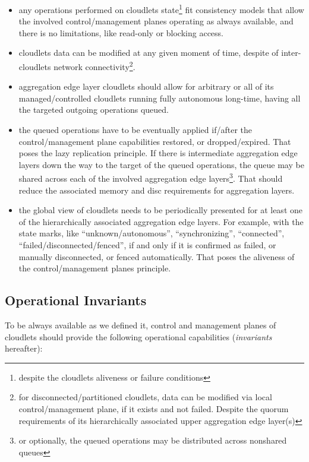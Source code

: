 \documentclass[conference]{IEEEtran}
\begin{document}
\begin{itemize}
  \item any operations performed on cloudlets state\footnote{despite the
    cloudlets aliveness or failure conditions} fit consistency models that
    allow the involved control/management planes operating as always available,
    and there is no limitations, like read-only or blocking access.
  \item cloudlets data can be modified at any given moment of time, despite of
    inter-cloudlets network connectivity\footnote{for disconnected/partitioned
    cloudlets, data can be modified via local control/management plane, if it
    exists and not failed. Despite the quorum requirements of its
    hierarchically associated upper aggregation edge layer(s)}.
  \item aggregation edge layer cloudlets should allow for arbitrary or all of
    its managed/controlled cloudlets running fully autonomous long-time, having
    all the targeted outgoing operations queued.
  \item the queued operations have to be eventually applied if/after the
    control/management plane capabilities restored, or dropped/expired. That
    poses the lazy replication principle. If there is intermediate
    aggregation edge layers down the way to the target of the queued operations,
    the queue may be shared across each of the involved aggregation edge
    layers\footnote{or optionally, the queued operations may be distributed
    across nonshared queues}. That should reduce the associated memory and disc
    requirements for aggregation layers.
  \item the global view of cloudlets needs to be periodically presented for at
    least one of the hierarchically associated aggregation edge layers. For
    example, with the state marks, like ``unknown/autonomous'',
    ``synchronizing'', ``connected'', ``failed/disconnected/fenced'', if and
    only if it is confirmed as failed, or manually disconnected, or fenced
    automatically. That poses the aliveness of the control/management planes
    principle.
\end{itemize}

\subsection{Operational Invariants}

To be always available as we defined it, control and management planes of
cloudlets should provide the following operational capabilities
(\textit{invariants} hereafter):
\end{document}
